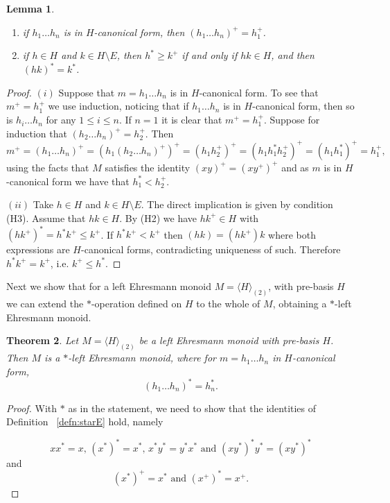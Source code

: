 \documentclass[12pt]{amsart}
\newtheorem{them}{Theorem}[section]
\newtheorem{lem}[them]{Lemma}
\theoremstyle{definition}
\theoremstyle{definition}
\numberwithin{them}{section}
\numberwithin{equation}{section}
\begin{document}
{{\begin{lem}
\begin{enumerate}
    \item[$(i)$] if  $h_1\dots h_n$ is  in $H$-canonical form, then $(h_1\dots h_n)^+=h_1^+$.
   
    \item[$(ii)$]  if $h \in H$ and $k \in H\setminus E$, then  $h^{\ast} \geq k^{+}$ if and only if  $hk\in H$, and then $(hk)^\ast = k^\ast$.
\end{enumerate}
\end{lem}

\begin{proof} $(i)$ Suppose that $m=h_1\dots h_n$ is in $H$-canonical form. To see that $m^+=h_1^+$ we use induction, noticing that if $h_1\dots h_n$ is in $H$-canonical form, then so is $h_i\dots h_n$ for any $1\leq i\leq n$. If $n=1$ it is clear that $m^+=h_1^+$. Suppose for induction that
$(h_2\dots h_n)^+=h_2^+$. Then 
\[m^+=(h_1\dots h_n)^+=(h_1(h_2\dots h_n)^+)^+
=(h_1h_2^+)^+=(h_1h_1^*h_2^+)^+=(h_1h_1^*)^+=h_1^+,\]
using the facts that $M$ satisfies the identity $(xy)^+=(xy^+)^+$ and as $m$ is in $H$-canonical form we have that $h_1^*<h_2^+$.


$(ii)$ Take $h\in H$ and $k\in H\setminus E$. The direct implication is given by condition (H3). Assume that
$hk\in H$. By (H2) we have  $hk^+\in H$ with $(hk^+)^*=h^*k^+\leq k^+$. If $h^*k^+ < k^+$ then 
 $(hk)=(hk^+)k$  where both expressions are  $H$-canonical forms, contradicting uniqueness of such. Therefore $h^*k^+ =k^+$, i.e. $k^+\leq h^*$.
    \end{proof}


Next we show that  for a left Ehresmann monoid $M=\langle H\rangle_{(2)}$, with pre-basis $H$   we can extend the $*$-operation defined on $H$ to the whole of $M$, obtaining a $*$-left Ehresmann monoid.





\begin{them}\label{prop:total} 
Let $M=\langle H\rangle_{(2)}$ be a left Ehresmann monoid with 
pre-basis $H$.  Then $M$ is a $*$-left  Ehresmann monoid, where  for  $m=h_1\dots h_n$  in $H$-canonical form, 
    $$(h_1\dots h_n)^\ast = h_n^\ast.$$
  \end{them}  
\begin{proof} With $*$ as in the statement,   we
need to show that the identities of Definition ~\ref {defn:starE} hold, namely

\[ xx^*=x, \, (x^*)^*=x^*,\, x^*y^*=y^*x^*\mbox{ and }(xy^*)^*y^*=(xy^*)^*  \] and 
$$(x^*)^+=x^*\mbox{ and }(x^+)^*=x^+.$$


\end{proof}}}
\end{document}
